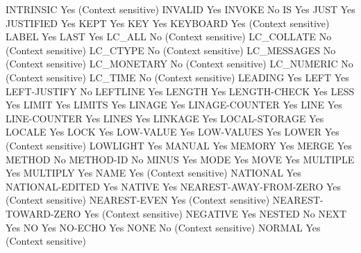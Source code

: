 INTRINSIC                       Yes (Context sensitive)
INVALID                         Yes
INVOKE                          No
IS                              Yes
JUST                            Yes
JUSTIFIED                       Yes
KEPT                            Yes
KEY                             Yes
KEYBOARD                        Yes (Context sensitive)
LABEL                           Yes
LAST                            Yes
LC_ALL                          No (Context sensitive)
LC_COLLATE                      No (Context sensitive)
LC_CTYPE                        No (Context sensitive)
LC_MESSAGES                     No (Context sensitive)
LC_MONETARY                     No (Context sensitive)
LC_NUMERIC                      No (Context sensitive)
LC_TIME                         No (Context sensitive)
LEADING                         Yes
LEFT                            Yes
LEFT-JUSTIFY                    No
LEFTLINE                        Yes
LENGTH                          Yes
LENGTH-CHECK                    Yes
LESS                            Yes
LIMIT                           Yes
LIMITS                          Yes
LINAGE                          Yes
LINAGE-COUNTER                  Yes
LINE                            Yes
LINE-COUNTER                    Yes
LINES                           Yes
LINKAGE                         Yes
LOCAL-STORAGE                   Yes
LOCALE                          Yes
LOCK                            Yes
LOW-VALUE                       Yes
LOW-VALUES                      Yes
LOWER                           Yes (Context sensitive)
LOWLIGHT                        Yes
MANUAL                          Yes
MEMORY                          Yes
MERGE                           Yes
METHOD                          No
METHOD-ID                       No
MINUS                           Yes
MODE                            Yes
MOVE                            Yes
MULTIPLE                        Yes
MULTIPLY                        Yes
NAME                            Yes (Context sensitive)
NATIONAL                        Yes
NATIONAL-EDITED                 Yes
NATIVE                          Yes
NEAREST-AWAY-FROM-ZERO          Yes (Context sensitive)
NEAREST-EVEN                    Yes (Context sensitive)
NEAREST-TOWARD-ZERO             Yes (Context sensitive)
NEGATIVE                        Yes
NESTED                          No
NEXT                            Yes
NO                              Yes
NO-ECHO                         Yes
NONE                            No (Context sensitive)
NORMAL                          Yes (Context sensitive)
